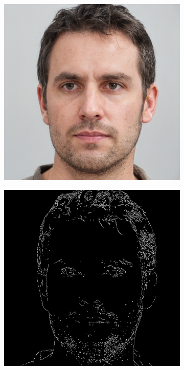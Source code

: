 \documentclass{70_styles/svproc}
\begin{document}
\begin{figure}
\begin{subfigure}[b]{0.2\textwidth}
     \end{subfigure}
     \par\medskip
     \begin{subfigure}[b]{0.2\textwidth}
         \centering
         \includegraphics[width=\textwidth]{70_figures/seed0049.png}
     \end{subfigure}
     \begin{subfigure}[b]{0.2\textwidth}
         \centering
         \includegraphics[width=\textwidth]{70_figures/canny-seed0049.png}

\end{subfigure}
\end{figure}
\end{document}
